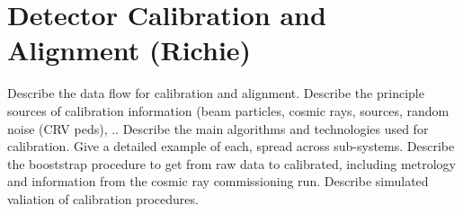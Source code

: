 \section{Detector Calibration and Alignment (Richie)}
\label{sec:calibration}

Describe the data flow for calibration and alignment.
Describe the principle sources of calibration information (beam particles, cosmic rays, sources, random noise (CRV peds), ..
Describe the main algorithms and technologies used for calibration.
Give a detailed example of each, spread across sub-systems.
Describe the booststrap procedure to get from raw data to calibrated, including metrology and information from the cosmic ray commissioning run.
Describe simulated valiation of calibration procedures.


